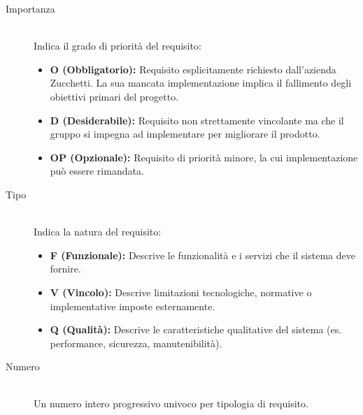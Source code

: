 \documentclass[11pt,a4paper]{article}
\begin{document}
\begin{description}
    \item[Importanza] \hfill \\
    Indica il grado di priorità del requisito:
    \begin{itemize}
        \item \textbf{O (Obbligatorio):} Requisito esplicitamente richiesto dall'azienda Zucchetti. La sua mancata implementazione implica il fallimento degli obiettivi primari del progetto.
        \item \textbf{D (Desiderabile):} Requisito non strettamente vincolante ma che il gruppo si impegna ad implementare per migliorare il prodotto.
        \item \textbf{OP (Opzionale):} Requisito di priorità minore, la cui implementazione può essere rimandata.
    \end{itemize}
    
    \item[Tipo] \hfill \\
    Indica la natura del requisito:
    \begin{itemize}
        \item \textbf{F (Funzionale):} Descrive le funzionalità e i servizi che il sistema deve fornire.
        \item \textbf{V (Vincolo):} Descrive limitazioni tecnologiche, normative o implementative imposte esternamente.
        \item \textbf{Q (Qualità):} Descrive le caratteristiche qualitative del sistema (es. performance, sicurezza, manutenibilità).
    \end{itemize}
    
    \item[Numero] \hfill \\
    Un numero intero progressivo univoco per tipologia di requisito.
\end{description}
\end{document}
